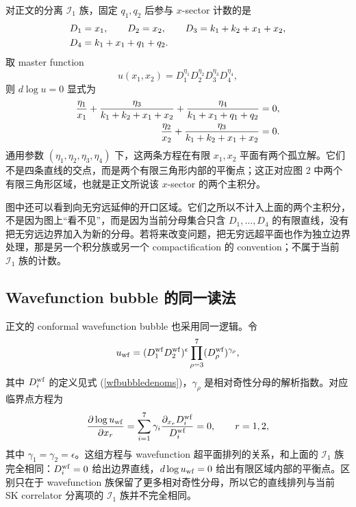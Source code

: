 ﻿\documentclass[a4paper,11pt]{article}
\begin{document}
对正文的分离 $\mathcal{I}_1$ 族，固定 $q_1,q_2$ 后参与 $x$-sector 计数的是
\begin{align}
    D_1&=x_1,\qquad
    D_2=x_2,\qquad
    D_3=k_1+k_2+x_1+x_2,\notag\\
    D_4&=k_1+x_1+q_1+q_2.
\end{align}
取 master function
\begin{equation}
    u(x_1,x_2)=D_1^{\eta_1}D_2^{\eta_2}D_3^{\eta_3}D_4^{\eta_4},
\end{equation}
则 $d\log u=0$ 显式为
\begin{align}
    \frac{\eta_1}{x_1}
    +\frac{\eta_3}{k_1+k_2+x_1+x_2}
    +\frac{\eta_4}{k_1+x_1+q_1+q_2}
    &=0,\notag\\
    \frac{\eta_2}{x_2}
    +\frac{\eta_3}{k_1+k_2+x_1+x_2}
    &=0.
\end{align}
通用参数 $(\eta_1,\eta_2,\eta_3,\eta_4)$ 下，这两条方程在有限 $x_1,x_2$ 平面有两个孤立解。它们不是四条直线的交点，而是两个有限三角形内部的平衡点；这正对应图 2 中两个有限三角形区域，也就是正文所说该 $x$-sector 的两个主积分。

图中还可以看到向无穷远延伸的开口区域。它们之所以不计入上面的两个主积分，不是因为图上“看不见”，而是因为当前分母集合只含 $D_1,\dots,D_4$ 的有限直线，没有把无穷远边界加入为新的分母。若将来改变问题，把无穷远超平面也作为独立边界处理，那是另一个积分族或另一个 compactification 的 convention；不属于当前 $\mathcal{I}_1$ 族的计数。

\subsection{Wavefunction bubble 的同一读法}

正文的 conformal wavefunction bubble 也采用同一逻辑。令
\begin{equation}
    u_{\rm wf}=(D^{\rm wf}_1D^{\rm wf}_2)^\epsilon
    \prod_{\rho=3}^{7}(D^{\rm wf}_\rho)^{\gamma_\rho},
\end{equation}
其中 $D^{\rm wf}_i$ 的定义见式 (\ref{wfbubbledenoms})，$\gamma_\rho$ 是相对奇性分母的解析指数。对应临界点方程为
\begin{equation}
    \frac{\partial\log u_{\rm wf}}{\partial x_r}
    =
    \sum_{i=1}^{7}\gamma_i\frac{\partial_{x_r}D^{\rm wf}_i}{D^{\rm wf}_i}
    =0,\qquad r=1,2,
\end{equation}
其中 $\gamma_1=\gamma_2=\epsilon$。这组方程与 wavefunction 超平面排列的关系，和上面的 $\mathcal{I}_1$ 族完全相同：$D^{\rm wf}_i=0$ 给出边界直线，$d\log u_{\rm wf}=0$ 给出有限区域内部的平衡点。区别只在于 wavefunction 族保留了更多相对奇性分母，所以它的直线排列与当前 SK correlator 分离项的 $\mathcal{I}_1$ 族并不完全相同。
\end{document}
